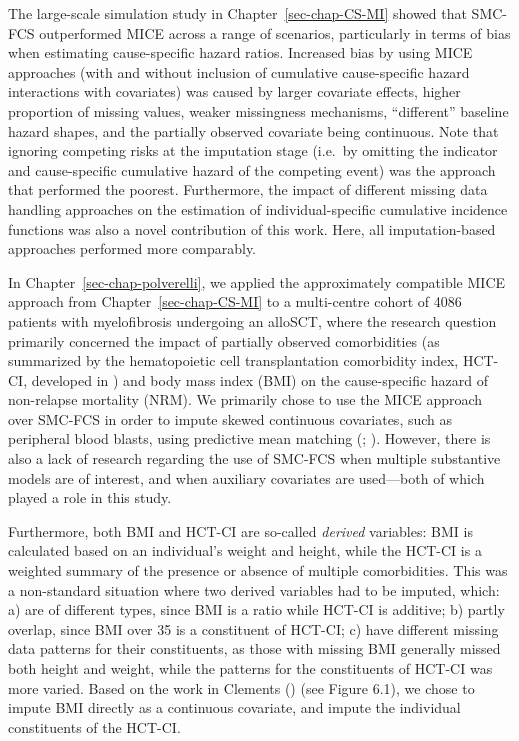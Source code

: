 \documentclass[
  letterpaper,
  paper=240mm:170mm,
  twoside=true,
  open=right,
  fontsize=10pt,
  pagesize=false,
  BCOR=15mm,
  DIV=14,
  headinclude=true,
  footinclude=false,
  headsepline=on]{scrbook}
\begin{document}
The large-scale simulation study in Chapter~\ref{sec-chap-CS-MI} showed
that SMC-FCS outperformed MICE across a range of scenarios, particularly
in terms of bias when estimating cause-specific hazard ratios. Increased
bias by using MICE approaches (with and without inclusion of cumulative
cause-specific hazard interactions with covariates) was caused by larger
covariate effects, higher proportion of missing values, weaker
missingness mechanisms, ``different'' baseline hazard shapes, and the
partially observed covariate being continuous. Note that ignoring
competing risks at the imputation stage (i.e.~by omitting the indicator
and cause-specific cumulative hazard of the competing event) was the
approach that performed the poorest. Furthermore, the impact of
different missing data handling approaches on the estimation of
individual-specific cumulative incidence functions was also a novel
contribution of this work. Here, all imputation-based approaches
performed more comparably.

In Chapter~\ref{sec-chap-polverelli}, we applied the approximately
compatible MICE approach from Chapter~\ref{sec-chap-CS-MI} to a
multi-centre cohort of 4086 patients with myelofibrosis undergoing an
alloSCT, where the research question primarily concerned the impact of
partially observed comorbidities (as summarized by the hematopoietic
cell transplantation comorbidity index, HCT-CI, developed in
) and body mass index (BMI) on the cause-specific
hazard of non-relapse mortality (NRM). We primarily chose to use the
MICE approach over SMC-FCS in order to impute skewed continuous
covariates, such as peripheral blood blasts, using predictive mean
matching (; ). However, there is also a lack of research regarding the use of
SMC-FCS when multiple substantive models are of interest, and when
auxiliary covariates are used---both of which played a role in this
study.

Furthermore, both BMI and HCT-CI are so-called \emph{derived} variables:
BMI is calculated based on an individual's weight and height, while the
HCT-CI is a weighted summary of the presence or absence of multiple
comorbidities. This was a non-standard situation where two derived
variables had to be imputed, which: a) are of different types, since BMI
is a ratio while HCT-CI is additive; b) partly overlap, since BMI over
35 is a constituent of HCT-CI; c) have different missing data patterns
for their constituents, as those with missing BMI generally missed both
height and weight, while the patterns for the constituents of HCT-CI was
more varied. Based on the work in Clements
() (see Figure
6.1), we chose to impute BMI directly as a continuous covariate, and
impute the individual constituents of the HCT-CI.
\end{document}

